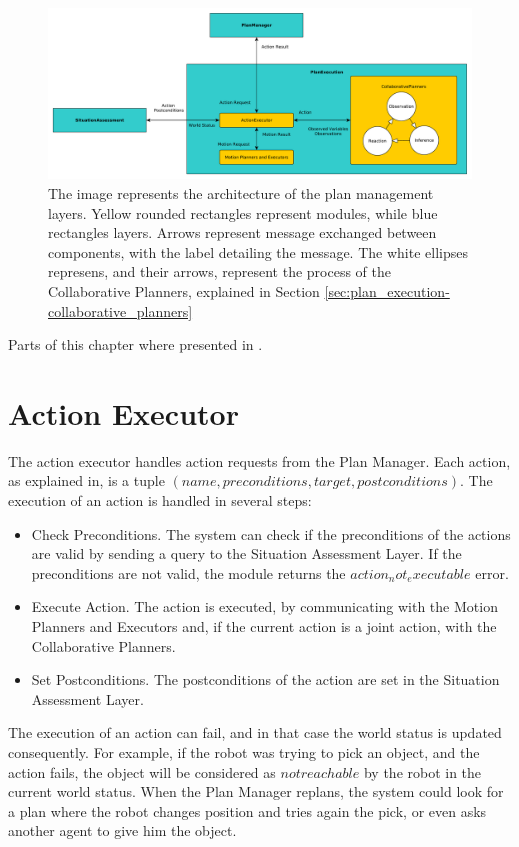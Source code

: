 \begin{figure}[h!]
	\centering
	\includegraphics[clip,scale=0.4]{img/plan_execution/architecture.pdf}
	\caption{The image represents the architecture of the plan management layers. Yellow rounded rectangles represent modules, while blue rectangles layers. Arrows represent message exchanged between components, with the label detailing the message. The white ellipses represens, and their arrows, represent the process of the Collaborative Planners, explained in Section \ref{sec:plan_execution-collaborative_planners} }
	\label{fig:plan_execution:architecture}
\end{figure}


Parts of this chapter where presented in \cite{fioreiser2014}.

\section{Action Executor}
\label{sec:plan_execution-action_executor}
The action executor handles action requests from the Plan Manager. Each action, as explained in, is a tuple $(name, preconditions, target, postconditions)$. The execution of an action is handled in several steps:
\begin{itemize}
\item Check Preconditions. The system can check if the preconditions of the actions are valid by sending a query to the Situation Assessment Layer. If the preconditions are not valid, the module returns the $action_not_executable$ error.
\item Execute Action. The action is executed, by communicating with the Motion Planners and Executors and, if the current action is a joint action, with the Collaborative Planners.
\item Set Postconditions. The postconditions of the action are set in the Situation Assessment Layer.
\end{itemize}

The execution of an action can fail, and in that case the world status is updated consequently. For example, if the robot was trying to pick an object, and the action fails, the object will be considered as $not reachable$ by the robot in the current world status. When the Plan Manager replans, the system could look for a plan where the robot changes position and tries again the pick, or even asks another agent to give him the object.

